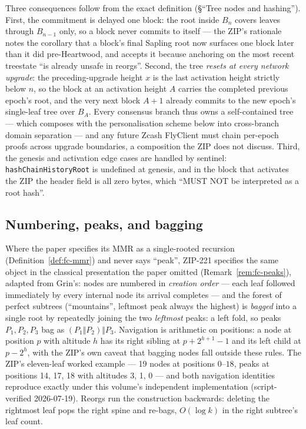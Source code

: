 \documentclass[11pt,a4paper]{article}
\theoremstyle{definition}
\begin{document}
Three consequences follow from the exact definition (\S``Tree nodes and
hashing''). First, the commitment is delayed one block: the root inside
$B_n$ covers leaves through $B_{n-1}$ only, so a block never commits to
itself --- the ZIP's rationale notes the corollary that a block's final
Sapling root now surfaces one block later than it did pre-Heartwood, and
accepts it because anchoring on the most recent treestate ``is already
unsafe in reorgs''. Second, the tree \emph{resets at every network
upgrade}: the preceding-upgrade height $x$ is the last activation height
strictly below $n$, so the block at an activation height $A$ carries the
completed previous epoch's root, and the very next block $A+1$ already
commits to the new epoch's single-leaf tree over $B_A$. Every consensus branch thus owns a
self-contained tree --- which composes with the personalisation scheme
below into cross-branch domain separation --- and any future Zcash
FlyClient must chain per-epoch proofs across upgrade boundaries, a
composition the ZIP does not discuss. Third, the genesis and activation
edge cases are handled by sentinel: \texttt{hashChainHistoryRoot} is
undefined at genesis, and in the block that activates the ZIP the header
field is all zero bytes, which ``MUST NOT be interpreted as a root
hash''.

\subsection{Numbering, peaks, and bagging}\label{sec:fc-bagging}

Where the paper specifies its MMR as a single-rooted recursion
(Definition~\ref{def:fc-mmr}) and never says ``peak'', ZIP-221 specifies
the same object in the classical presentation the paper omitted
(Remark~\ref{rem:fc-peaks}), adapted from Grin's: nodes are numbered in
\emph{creation order} --- each leaf followed immediately by every
internal node its arrival completes --- and the forest of perfect
subtrees (``mountains'', leftmost peak always the highest) is
\emph{bagged} into a single root by repeatedly joining the two
\emph{leftmost} peaks: a left fold, so peaks $P_1, P_2, P_3$ bag as
$(P_1 \Vert P_2) \Vert P_3$. Navigation is arithmetic on positions: a
node at position $p$ with altitude $h$ has its right sibling at
$p + 2^{h+1} - 1$ and its left child at $p - 2^h$, with the ZIP's own
caveat that bagging nodes fall outside these rules. The ZIP's eleven-leaf
worked example --- 19 nodes at positions $0$--$18$, peaks at positions
14, 17, 18 with altitudes 3, 1, 0 --- and both navigation identities
reproduce exactly under this volume's independent implementation
(script-verified 2026-07-19). Reorgs run the construction backwards:
deleting the rightmost leaf pops the right spine and re-bags, $O(\log k)$
in the right subtree's leaf count.
\end{document}
